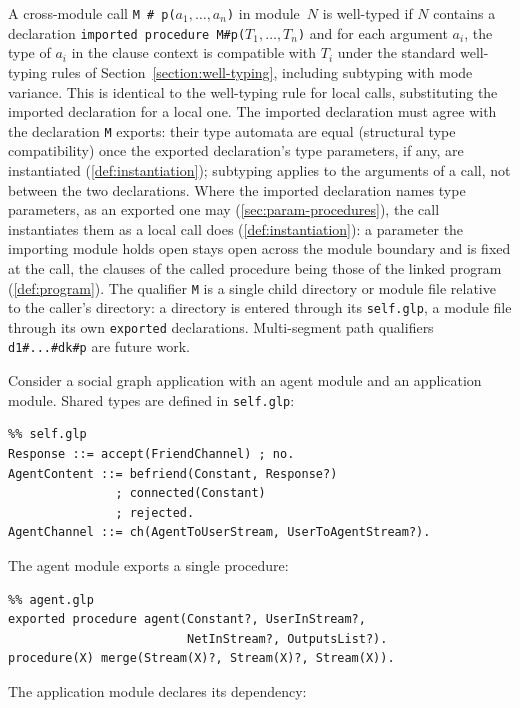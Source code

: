 A cross-module call \verb|M # p(|$a_1, \ldots, a_n$\verb|)| in module~$N$ is well-typed if $N$ contains a declaration \verb|imported procedure M#p(|$T_1, \ldots, T_n$\verb|)| and for each argument $a_i$, the type of $a_i$ in the clause context is compatible with $T_i$ under the standard well-typing rules of Section~\ref{section:well-typing}, including subtyping with mode variance.  This is identical to the well-typing rule for local calls, substituting the imported declaration for a local one.  The imported declaration must agree with the declaration \verb|M| exports: their type automata are equal (structural type compatibility) once the exported declaration's type parameters, if any, are instantiated (\cref{def:instantiation}); subtyping applies to the arguments of a call, not between the two declarations.  Where the imported declaration names type parameters, as an exported one may (\cref{sec:param-procedures}), the call instantiates them as a local call does (\cref{def:instantiation}): a parameter the importing module holds open stays open across the module boundary and is fixed at the call, the clauses of the called procedure being those of the linked program (\cref{def:program}).  The qualifier \verb|M| is a single child directory or module file relative to the caller's directory: a directory is entered through its \verb|self.glp|, a module file through its own \verb|exported| declarations.  Multi-segment path qualifiers \verb|d1#...#dk#p| are future work.

Consider a social graph application with an agent module and an application module.  Shared types are defined in \verb|self.glp|:

\begin{verbatim}
%% self.glp
Response ::= accept(FriendChannel) ; no.
AgentContent ::= befriend(Constant, Response?)
               ; connected(Constant)
               ; rejected.
AgentChannel ::= ch(AgentToUserStream, UserToAgentStream?).
\end{verbatim}

The agent module exports a single procedure:

\begin{verbatim}
%% agent.glp
exported procedure agent(Constant?, UserInStream?,
                         NetInStream?, OutputsList?).
procedure(X) merge(Stream(X)?, Stream(X)?, Stream(X)).
\end{verbatim}

The application module declares its dependency:

